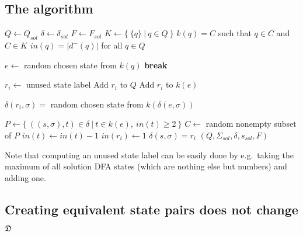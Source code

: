 \subsection{The algorithm}

\vspace{0.2cm}
\begin{spacing}{1}
\begin{algorithmic}[1]
    \State $Q \gets Q_{sol}$
    \State $\delta \gets \delta_{sol}$
    \State $F \gets F_{sol}$
	\State $K \gets \{\ \{q\}\ |\ q \in Q\ \}$ 
	\State $k(q) = C$ such that $q \in C$ and $C \in K$ 
	\State $in(q) = |d^-(q)|$ for all $q \in Q$ 
	
		 
				\State $e \gets$ random chosen state from $k(q)$
				\State \textbf{break}
			\EndIf
		\EndFor
		
		\State $r_i \gets$ unused state label 
        \State Add $r_i$ to $Q$
		\State Add $r_i$ to $k(e)$
		
		 
			\State $\delta(r_i, \sigma) =$ random chosen state from $k(\delta(e, \sigma))$
		\EndFor
		
		\State $P \gets \{\ ((s, \sigma), t) \in \delta\ |\ t \in k(e),\ in(t) \geq 2\ \}$ 
		\State $C \gets$ random nonempty subset of $P$
			\State $in(t) \gets in(t) - 1$
			\State $in(r_i) \gets 1$
            \State $\delta(s, \sigma) = r_i$
		\EndFor
	\EndFor
    \State \Return $(Q, \Sigma_{sol}, \delta, s_{sol}, F)$
	\EndFunction
\end{algorithmic}
\end{spacing}
\vspace{0.2cm}
\noindent Note that computing an unused state label can be easily done by e.g.\ taking the maximum of all solution DFA states (which are nothing else but numbers) and adding one.

\subsection{Creating equivalent state pairs does not change $\mathfrak{D}$} \label{ch:3:sec-D-proof}

